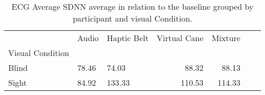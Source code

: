 
\begin{table}[!htb]
\centering
\caption{ECG Average SDNN average in relation to the baseline grouped by participant and visual Condition.}
\label{tab:sdnn_average_group_noBase [ms]}
\begin{tabular}{lllrrrr}
\toprule
{} &  Audio & Haptic Belt & Virtual Cane & Mixture \\
Visual Condition &        &             &              &         \\
\midrule
Blind            &  78.46 &       74.03 &        88.32 &   88.13 \\
Sight            &  84.92 &      133.33 &       110.53 &  114.33 \\
\bottomrule
\end{tabular}
\end{table}

